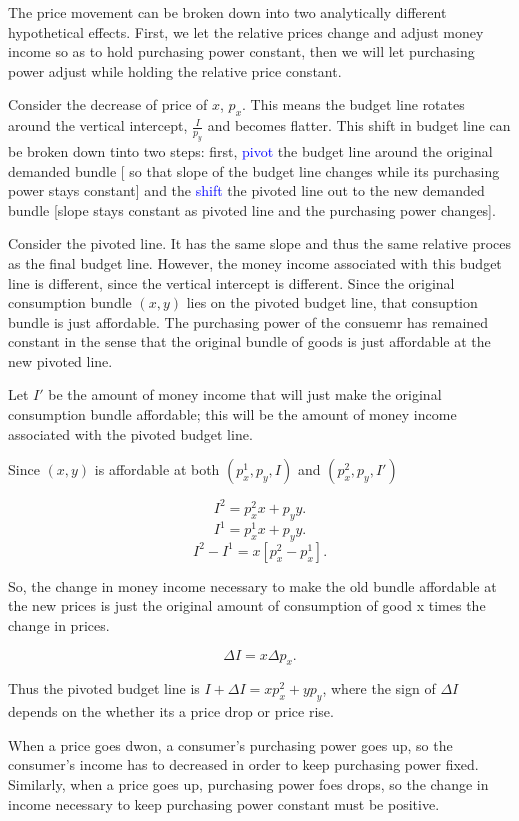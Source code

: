 \documentclass{tufte-handout}
\begin{document}
The price  movement can be broken down into two analytically different hypothetical effects. First, we let the relative prices change and adjust money income so as to hold purchasing power constant, then we will let purchasing power adjust while holding the relative price constant.


\clearpage


Consider the decrease of price of $x$,  $p_x$. This means the budget line rotates around the vertical intercept,  $\frac{I}{p_y}$ and becomes flatter. This  shift in budget line can be broken down tinto two steps: first,\textcolor{blue}{ pivot} the budget line around the original demanded bundle [ so that slope of the budget line changes while its purchasing power stays constant] and the \textcolor{blue}{shift} the pivoted line out to the new demanded bundle [slope stays constant as pivoted line and the purchasing power changes].


Consider the pivoted line. It has the same slope and thus the same relative proces as the final budget line. However, the money income associated with this budget line is different, since the vertical intercept is different. Since the original consumption bundle $(x,y)$ lies on the pivoted budget line, that consuption bundle is just affordable. The purchasing power of the consuemr has remained constant in the sense that the original bundle of goods is just affordable at the new pivoted line.

Let  $I'$ be the amount of  money income that will just make the original consumption bundle affordable; this will be the amount of money income associated with the pivoted budget line.

Since  $(x,y)$ is affordable at both  $(p_x^1,p_y,I)$ and  $(p_x^2,p_y,I')$

\[
I^2 = p_x^2x + p_yy .\] 
\[ I^1 = p_x^1x + p_yy
.\] 
\[ I^2  - I^1 = x[p_x^2 - p_x^1]   .\] 

So, the change in money income necessary to make the old bundle affordable at the new prices is just the original amount of consumption of good x times the change in prices.

\[  \Delta I  = x \Delta p_x .\]

Thus the pivoted budget line is $I + \Delta I = xp_x^2 + yp_y $,
where the sign of  $\Delta I$ depends on the whether its a price drop or price rise. 

When a price goes dwon, a consumer's purchasing power goes up, so the consumer's income has to decreased in order to keep purchasing power fixed. Similarly, when a price goes up, purchasing power foes drops, so the change in income necessary to keep purchasing power constant must be positive.
\end{document}
